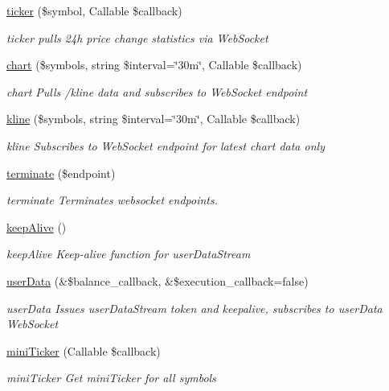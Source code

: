 \begin{DoxyCompactItemize}
\hyperlink{classBinance_1_1API_a0ef50663f1cca6d48620d458fd26ee28}{ticker} (\$symbol, Callable \$callback)
\begin{DoxyCompactList}\small\item\em ticker pulls 24h price change statistics via Web\-Socket \end{DoxyCompactList}\item 
\hyperlink{classBinance_1_1API_a1e0a2985b3ff7e4e9c1155a8e46caa5c}{chart} (\$symbols, string \$interval=\char`\"{}30m\char`\"{}, Callable \$callback)
\begin{DoxyCompactList}\small\item\em chart Pulls /kline data and subscribes to  Web\-Socket endpoint \end{DoxyCompactList}\item 
\hyperlink{classBinance_1_1API_a20661f6cf682e433fcdfc035a9388c5f}{kline} (\$symbols, string \$interval=\char`\"{}30m\char`\"{}, Callable \$callback)
\begin{DoxyCompactList}\small\item\em kline Subscribes to  Web\-Socket endpoint for latest chart data only \end{DoxyCompactList}\item 
\hyperlink{classBinance_1_1API_a67ed560d60527ad64f16253069cb1b14}{terminate} (\$endpoint)
\begin{DoxyCompactList}\small\item\em terminate Terminates websocket endpoints. \end{DoxyCompactList}\item 
\hyperlink{classBinance_1_1API_a2a29ca9ab18d04ff2e42aa6e5e0ce312}{keep\-Alive} ()
\begin{DoxyCompactList}\small\item\em keep\-Alive Keep-\/alive function for user\-Data\-Stream \end{DoxyCompactList}\item 
\hyperlink{classBinance_1_1API_af033a40a6a86ad422c58d67dc57bb0fd}{user\-Data} (\&\$balance\-\_\-callback, \&\$execution\-\_\-callback=false)
\begin{DoxyCompactList}\small\item\em user\-Data Issues user\-Data\-Stream token and keepalive, subscribes to user\-Data Web\-Socket \end{DoxyCompactList}\item 
\hyperlink{classBinance_1_1API_a9790abae353fbde93bc42069c672f3e2}{mini\-Ticker} (Callable \$callback)
\begin{DoxyCompactList}\small\item\em mini\-Ticker Get mini\-Ticker for all symbols \end{DoxyCompactList}\end{DoxyCompactItemize}
